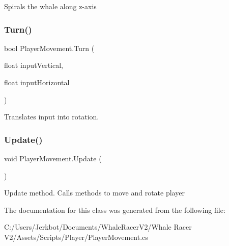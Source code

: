 Spirals the whale along z-\/axis 

\mbox{\label{class_player_movement_a32c7ec914f2b18dfcf6e9c354f6e2f8e}} 
\subsubsection{\texorpdfstring{Turn()}{Turn()}}
{\footnotesize\ttfamily bool Player\+Movement.\+Turn (\begin{DoxyParamCaption}\item[{float}]{input\+Vertical,  }\item[{float}]{input\+Horizontal }\end{DoxyParamCaption})}



Translates input into rotation. 

\mbox{\label{class_player_movement_aaf9b77d7177d538be9c1447d08191322}} 
\subsubsection{\texorpdfstring{Update()}{Update()}}
{\footnotesize\ttfamily void Player\+Movement.\+Update (\begin{DoxyParamCaption}{ }\end{DoxyParamCaption})\hspace{0.3cm}{\ttfamily [private]}}



Update method. Calls methods to move and rotate player 



The documentation for this class was generated from the following file\+:\begin{DoxyCompactItemize}
\item 
C\+:/\+Users/\+Jerkbot/\+Documents/\+Whale\+Racer\+V2/\+Whale Racer V2/\+Assets/\+Scripts/\+Player/Player\+Movement.\+cs\end{DoxyCompactItemize}
